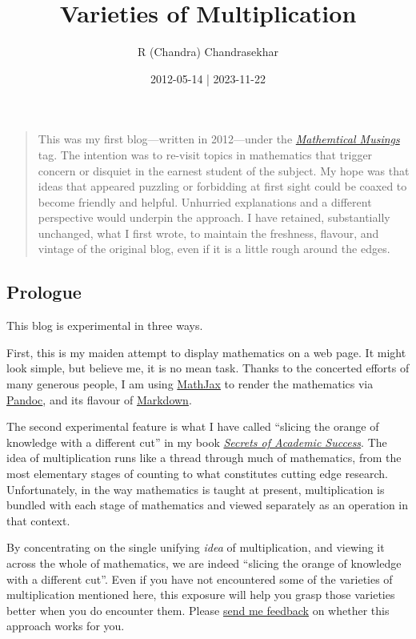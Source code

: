 \documentclass[
  a4paper,
]{article}
\title{Varieties of Multiplication}
\author{R (Chandra) Chandrasekhar}
\date{2012-05-14 | 2023-11-22}
\begin{document}
\maketitle

\thispagestyle{empty}


\begin{quote}
This was my first blog---written in 2012---under the
\href{https://swanlotus.netlify.app/tag/mathematical-musings}{\emph{Mathemtical
Musings}} tag. The intention was to re-visit topics in mathematics that
trigger concern or disquiet in the earnest student of the subject. My
hope was that ideas that appeared puzzling or forbidding at first sight
could be coaxed to become friendly and helpful. Unhurried explanations
and a different perspective would underpin the approach. I have
retained, substantially unchanged, what I first wrote, to maintain the
freshness, flavour, and vintage of the original blog, even if it is a
little rough around the edges.
\end{quote}

\hypertarget{prologue}{%
\subsection{Prologue}\label{prologue}}

This blog is experimental in three ways.

First, this is my maiden attempt to display mathematics on a web page.
It might look simple, but believe me, it is no mean task. Thanks to the
concerted efforts of many generous people, I am using
\href{https://www.mathjax.org/}{MathJax} to render the mathematics via
\href{https://pandoc.org/}{Pandoc}, and its flavour of
\href{https://garrettgman.github.io/rmarkdown/authoring_pandoc_markdown.html}{Markdown}.

The second experimental feature is what I have called ``slicing the
orange of knowledge with a different cut'' in my book
\href{https://swanlotus.netlify.app/sas}{\emph{Secrets of Academic
Success}}. The idea of multiplication runs like a thread through much of
mathematics, from the most elementary stages of counting to what
constitutes cutting edge research. Unfortunately, in the way mathematics
is taught at present, multiplication is bundled with each stage of
mathematics and viewed separately as an operation in that context.

By concentrating on the single unifying \emph{idea} of multiplication,
and viewing it across the whole of mathematics, we are indeed ``slicing
the orange of knowledge with a different cut''. Even if you have not
encountered some of the varieties of multiplication mentioned here, this
exposure will help you grasp those varieties better when you do
encounter them. Please \href{mailto:feedback.swanlotus@gmail.com}{send
me feedback} on whether this approach works for you.
\end{document}

